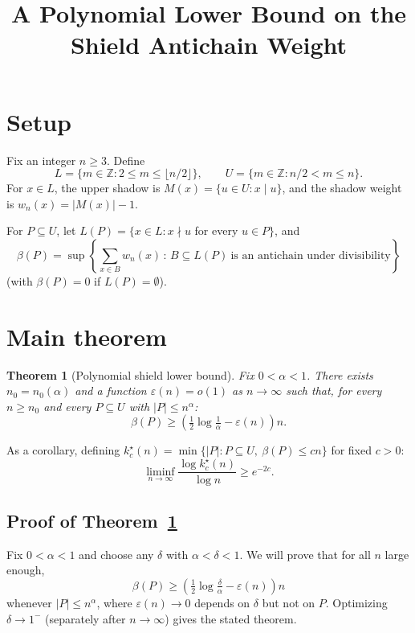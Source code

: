 \documentclass{article}
\title{A Polynomial Lower Bound on the Shield Antichain Weight}
\date{}
\newtheorem{theorem}{Theorem}
\begin{document}
\maketitle

\section{Setup}

Fix an integer $n \ge 3$. Define
\[L = \{m \in \mathbb{Z} : 2 \le m \le \lfloor n/2 \rfloor\}, \qquad U = \{m \in \mathbb{Z} : n/2 < m \le n\}.\]
For $x \in L$, the upper shadow is $M(x) = \{u \in U : x \mid u\}$, and the shadow weight is $w_n(x) = |M(x)| - 1$.

For $P \subseteq U$, let $L(P) = \{x \in L : x \nmid u$ for every $u \in P\}$, and
\[\beta(P) = \sup\left\{\sum_{x \in B} w_n(x) \, : \, B \subseteq L(P)\ \text{is an antichain under divisibility}\right\}\]
(with $\beta(P) = 0$ if $L(P) = \emptyset$).

\section{Main theorem}

\begin{theorem}[Polynomial shield lower bound]
\label{thm:poly-shield}
Fix $0 < \alpha < 1$. There exists $n_0 = n_0(\alpha)$ and a function $\varepsilon(n) = o(1)$ as $n \to \infty$ such that, for every $n \ge n_0$ and every $P \subseteq U$ with $|P| \le n^\alpha$:
\[\beta(P) \ge \left(\tfrac{1}{2}\log\tfrac{1}{\alpha} - \varepsilon(n)\right)n.\]
\end{theorem}

As a corollary, defining $k_c^\star(n) = \min\{|P| : P \subseteq U,\ \beta(P) \le cn\}$ for fixed $c > 0$:
\[\liminf_{n \to \infty} \frac{\log k_c^\star(n)}{\log n} \ge e^{-2c}.\]

\subsection{Proof of Theorem~\ref{thm:poly-shield}}

Fix $0 < \alpha < 1$ and choose any $\delta$ with $\alpha < \delta < 1$. We will prove that for all $n$ large enough,
\[\beta(P) \ge \left(\tfrac{1}{2}\log\tfrac{\delta}{\alpha} - \varepsilon(n)\right)n\]
whenever $|P| \le n^\alpha$, where $\varepsilon(n) \to 0$ depends on $\delta$ but not on $P$. Optimizing $\delta \to 1^-$ (separately after $n \to \infty$) gives the stated theorem.
\end{document}
